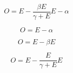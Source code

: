 \documentclass[10pt,a4paper]{article}
\begin{document}
$$ O = E - \frac{\beta E}{\gamma + E} E - \alpha $$

$$ O = E - \alpha $$

$$ O = E - \beta E $$

$$ O = E - \frac{E}{\gamma + E} E $$
\end{document}
